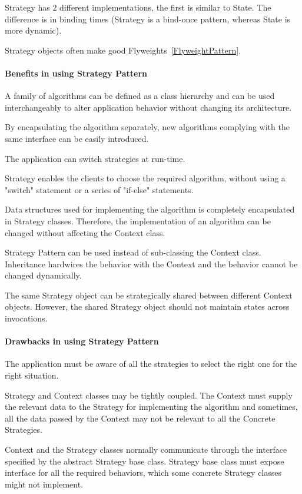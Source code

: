 \documentclass{book}
\begin{document}
    Strategy has 2 different implementations, the first is similar to State. The difference is in binding times (Strategy is a bind-once pattern, whereas State is more dynamic).

    Strategy objects often make good Flyweights~\ref{FlyweightPattern}.

\paragraph{Benefits in using Strategy Pattern}

    A family of algorithms can be defined as a class hierarchy and can be used interchangeably to alter application behavior without changing its architecture.

    By encapsulating the algorithm separately, new algorithms complying with the same interface can be easily introduced.

    The application can switch strategies at run-time.

    Strategy enables the clients to choose the required algorithm, without using a "switch" statement or a series of "if-else" statements.

    Data structures used for implementing the algorithm is completely encapsulated in Strategy classes. Therefore, the implementation of an algorithm can be changed without affecting the Context class.

    Strategy Pattern can be used instead of sub-classing the Context class. Inheritance hardwires the behavior with the Context and the behavior cannot be changed dynamically.

    The same Strategy object can be strategically shared between different Context objects. However, the shared Strategy object should not maintain states across invocations.

\paragraph{Drawbacks in using Strategy Pattern}

    The application must be aware of all the strategies to select the right one for the right situation.

    Strategy and Context classes may be tightly coupled. The Context must supply the relevant data to the Strategy for implementing the algorithm and sometimes,
    all the data passed by the Context may not be relevant to all the Concrete Strategies.

    Context and the Strategy classes normally communicate through the interface specified by the abstract Strategy base class.
    Strategy base class must expose interface for all the required behaviors, which some concrete Strategy classes might not implement.
\end{document}

